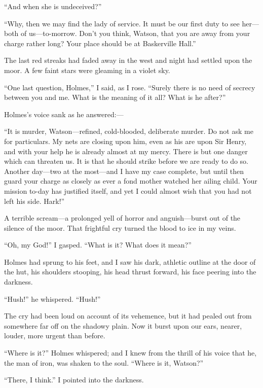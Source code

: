 \documentclass[paper=5.5in:8.5in,BCOR=7mm,twoside,DIV=calc,12pt,usegeometry,openany,chapterprefix,endperiod]{scrbook} %
\begin{document}
\enquote{And when she is undeceived?}

\enquote{Why, then we may find the lady of service. It must be our first duty to see her\nobreakdash---both of us\nobreakdash---to-morrow. Don't you think, Watson, that you are away from your charge rather long? Your place should be at Baskerville Hall.}

The last red streaks had faded away in the west and night had settled upon the moor. A few faint stars were gleaming in a violet sky.

\enquote{One last question, Holmes,} I said, as I rose. \enquote{Surely there is no need of secrecy between you and me. What is the meaning of it all? What is he after?}

Holmes's voice sank as he answered:\nobreakdash--- 

\enquote{It is murder, Watson\nobreakdash---refined, cold-blooded, deliberate mur\-der. Do not ask me for particulars. My nets are closing upon him, even as his are upon Sir Henry, and with your help he is already almost at my mercy. There is but one danger which can threaten us. It is that he should strike before we are ready to do so. Another day\nobreakdash---two at the most\nobreakdash---and I have my case complete, but until then guard your charge as closely as ever a fond mother watched her ailing child. Your mission to-day has justified itself, and yet I could almost wish that you had not left his side. Hark!}

A terrible scream\nobreakdash---a prolonged yell of horror and anguish\nobreakdash---burst out of the silence of the moor. That frightful cry turned the blood to ice in my veins.

\enquote{Oh, my God!} I gasped. \enquote{What is it? What does it mean?}

Holmes had sprung to his feet, and I saw his dark, athletic outline at the door of the hut, his shoulders stooping, his head thrust forward, his face peering into the darkness.

\enquote{Hush!} he whispered. \enquote{Hush!}

The cry had been loud on account of its vehemence, but it had pealed out from somewhere far off on the shadowy plain. Now it burst upon our ears, nearer, louder, more urgent than before.

\enquote{Where is it?} Holmes whispered; and I knew from the thrill of his voice that he, the man of iron, was shaken to the soul. \enquote{Where is it, Watson?}

\enquote{There, I think.} I pointed into the darkness.
\end{document}
